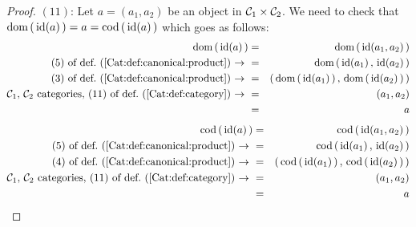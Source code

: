 \begin{proof}
    $(11)$: Let $a=(a_{1},a_{2})$ be an object in $\mbox{${\cal C}_{1}$}\times\mbox{${\cal C}_{2}$}$. We need
    to check that $\mbox{\rm dom}\,(\,\mbox{\rm id}(a)\,)=a=\mbox{\rm cod}\,(\,\mbox{\rm id}(a)\,)$ which goes as
    follows:
        \begin{eqnarray*}\dom\,(\,\id(a)\,)
            &=&\dom\,(\,\id(a_{1},a_{2})\,)\\
            \mbox{$(5)$ of def.~(\ref{Cat:def:canonical:product})\ $\to$\ }
            &=&\dom\,(\,\id(a_{1})\,,\,\id(a_{2})\,)\\
            \mbox{$(3)$ of def.~(\ref{Cat:def:canonical:product})\ $\to$\ }
            &=&(\,\dom\,(\,\id(a_{1})\,)\,,\,\dom\,(\,\id(a_{2})\,)\,)\\
            \mbox{\Cone,\ \Ctwo\ categories, 
                $(11)$ of def.~(\ref{Cat:def:category})\ $\to$\ }
            &=&(a_{1},a_{2})\\
            &=&a
        \end{eqnarray*}
        \begin{eqnarray*}\cod\,(\,\id(a)\,)
            &=&\cod\,(\,\id(a_{1},a_{2})\,)\\
            \mbox{$(5)$ of def.~(\ref{Cat:def:canonical:product})\ $\to$\ }
            &=&\cod\,(\,\id(a_{1})\,,\,\id(a_{2})\,)\\
            \mbox{$(4)$ of def.~(\ref{Cat:def:canonical:product})\ $\to$\ }
            &=&(\,\cod\,(\,\id(a_{1})\,)\,,\,\cod\,(\,\id(a_{2})\,)\,)\\
            \mbox{\Cone,\ \Ctwo\ categories, 
                $(11)$ of def.~(\ref{Cat:def:category})\ $\to$\ }
            &=&(a_{1},a_{2})\\
            &=&a
        \end{eqnarray*}
\end{proof}
